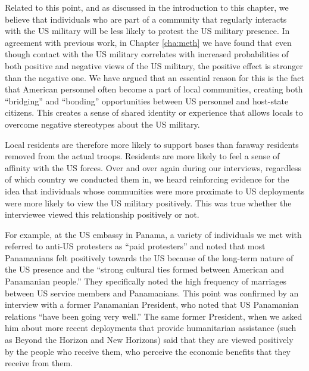 		Related to this point, and as discussed in the introduction to this chapter, we believe that individuals who are part of a community that regularly interacts with the US military will be less likely to protest the US military presence. In agreement with previous work, in Chapter \ref{cha:meth} we have found that even though contact with the US military correlates with increased probabilities of both positive and negative views of the US military, the positive effect is stronger than the negative one.\cite{Allen2020} We have argued that an essential reason for this is the fact that American personnel often become a part of local communities, creating both ``bridging'' and ``bonding'' opportunities between US personnel and host-state citizens.\cite{Woolcock2000}  This creates a sense of shared identity or experience that allows locals to overcome negative stereotypes about the US military. 
		
		Local residents are therefore more likely to support bases than faraway residents removed from the actual troops.\cite{Fitz2015,Flynn2018} Residents are more likely to feel a sense of affinity with the US forces. Over and over again during our interviews, regardless of which country we conducted them in, we heard reinforcing evidence for the idea that individuals whose communities were more proximate to US deployments were more likely to view the US military positively. This was true whether the interviewee viewed this relationship positively or not. 
		
		For example, at the US embassy in Panama, a variety of individuals we met with referred to anti-US protesters as ``paid protesters'' and noted that most Panamanians felt positively towards the US because  of the long-term nature of the US presence and the ``strong cultural ties formed between American and Panamanian people.''\cite{embone20180712} They specifically noted the high frequency of marriages between US service members and Panamanians. This point was confirmed by an interview with a former Panamanian President, who noted that US Panamanian relations ``have been going very well.''\cite[][The President noted that intermarriage also created some problems, as Panamanians who married American service members often became stateless after renouncing their Panamanian citizenship but before acquiring American citizenship.]{embthree20180712,pres20180714} The same former President, when we asked him about more recent deployments that provide humanitarian assistance (such as Beyond the Horizon and New Horizons) said that they are viewed positively by the people who receive them, who perceive the economic benefits that they receive from them.\cite{pres20180714}
		
